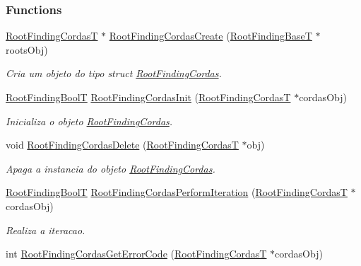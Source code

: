 \subsubsection*{Functions}
\begin{CompactItemize}
\item 
\hyperlink{structRootFindingCordas}{RootFindingCordasT} $\ast$ \hyperlink{group____cordas_g8e5327982ea6071bc6215f950d808bef}{RootFindingCordasCreate} (\hyperlink{structRootFindingBase}{RootFindingBaseT} $\ast$rootsObj)
\begin{CompactList}\small\item\em Cria um objeto do tipo struct \hyperlink{structRootFindingCordas}{RootFindingCordas}. \item\end{CompactList}\item 
\hyperlink{RootFindingCommon_8h_31228d356f5429fa5ba7f206e4dee12f}{RootFindingBoolT} \hyperlink{group____cordas_g4b4d161deefaec382d2f832af2654580}{RootFindingCordasInit} (\hyperlink{structRootFindingCordas}{RootFindingCordasT} $\ast$cordasObj)
\begin{CompactList}\small\item\em Inicializa o objeto \hyperlink{structRootFindingCordas}{RootFindingCordas}. \item\end{CompactList}\item 
void \hyperlink{group____cordas_g1b42f5cdb8c787c44539b6e0de8d968f}{RootFindingCordasDelete} (\hyperlink{structRootFindingCordas}{RootFindingCordasT} $\ast$obj)
\begin{CompactList}\small\item\em Apaga a instancia do objeto \hyperlink{structRootFindingCordas}{RootFindingCordas}. \item\end{CompactList}\item 
\hyperlink{RootFindingCommon_8h_31228d356f5429fa5ba7f206e4dee12f}{RootFindingBoolT} \hyperlink{group____cordas_gafc64dac7d95d2756d1259a599789441}{RootFindingCordasPerformIteration} (\hyperlink{structRootFindingCordas}{RootFindingCordasT} $\ast$cordasObj)
\begin{CompactList}\small\item\em Realiza a iteracao. \item\end{CompactList}\item 
int \hyperlink{group____cordas_gcc4b8454f6664e389c484498f42c17d8}{RootFindingCordasGetErrorCode} (\hyperlink{structRootFindingCordas}{RootFindingCordasT} $\ast$cordasObj)

\end{CompactItemize}

